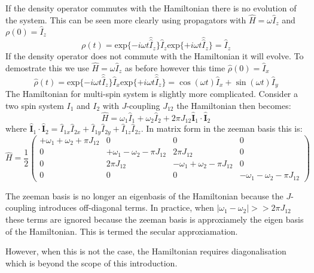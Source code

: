 If the density operator commutes with the Hamiltonian there is no evolution of the system.
This can be seen more clearly using propagators with $\hat{H} = \omega\hat{I}_z$ and $\rho(0) = \hat{I}_z$
\begin{equation}
  \rho(t) = \text{exp}\{-i\omega t\hat{\hat{I}}_z\}\hat{I}_z\text{exp}\{+i\omega t\hat{\hat{I}}_z\} = \hat{I}_z
\end{equation}
If the density operator does not commute with the Hamiltonian it will evolve. To demostrate this we use $\hat{H} = \omega\hat{I}_z$ as before  however this time $\hat\rho(0) = \hat{I}_x$
\begin{equation}
  \hat\rho(t) = \text{exp}\{-i\omega t\hat{\hat{I}}_z\}\hat{I}_x\text{exp}\{+i\omega t\hat{\hat{I}}_z\} = \cos(\omega t)\hat{I}_x + \sin(\omega t)\hat{I}_y
\end{equation}
The Hamiltonian for multi-spin system is slightly more complicated. Consider a two spin
system $I_1$ and $I_2$ with $J$-coupling $J_{12}$ the Hamiltonian then becomes:
\begin{equation}
  \hat{H} = \omega_1\hat{I}_1 + \omega_2\hat{I}_2 + 2\pi J_{12}\hat{\mathbf{I}}_1\cdot\hat{\mathbf{I}}_2
\end{equation}
where $\hat{\mathbf{I}}_1\cdot\hat{\mathbf{I}}_2 = \hat{I}_{1x}\hat{I}_{2x} + \hat{I}_{1y}\hat{I}_{2y} + \hat{I}_{1z}\hat{I}_{2z}$.
In matrix form in the zeeman basis this is:
\begin{equation}
  \hat{H} = \frac{1}{2}\begin{pmatrix}
    +\omega_1 + \omega_2 + \pi J_{12} & 0 & 0 & 0\\
    0 & +\omega_1 - \omega_2 - \pi J_{12} & 2\pi J_{12} & 0\\
    0 & 2\pi J_{12} & -\omega_1 + \omega_2 - \pi J_{12} & 0\\
    0 & 0 & 0 & -\omega_1 - \omega_2 - \pi J_{12}
\end{pmatrix}
\end{equation}

The zeeman basis is no longer an eigenbasis of the Hamiltonian because the $J$-coupling
introduces off-diagonal terms. In practice, when $|\omega_1-\omega_2| >> 2\pi J_{12}$
these terms are ignored because the zeeman basis is approxiamely the eigen basis of the Hamiltonian. This is termed the secular approxiamation.

However, when this is not the case, the Hamiltonian requires diagonalisation which is beyond the scope of this introduction.

\newpage

